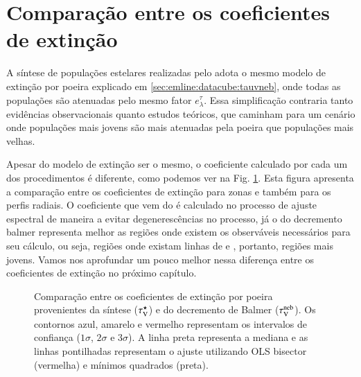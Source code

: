 \section{Comparação entre os coeficientes de extinção}
\label{sec:synvsneb:tauv}

A síntese de populações estelares realizadas pelo \starlight adota o mesmo modelo de extinção por
poeira explicado em \ref{sec:emline:datacube:tauvneb}, onde todas as populações são atenuadas pelo
mesmo fator $e^\tau_\lambda$. Essa simplificação contraria tanto evidências observacionais quanto
estudos teóricos, que caminham para um cenário onde populações mais jovens são mais atenuadas pela
poeira que populações mais velhas. 

Apesar do modelo de extinção ser o mesmo, o coeficiente calculado por cada um dos procedimentos é
diferente, como podemos ver na Fig. \ref{fig:tauVsynvsneb}. Esta figura apresenta a comparação entre
os coeficientes de extinção para zonas e também para os perfis radiais. O coeficiente que vem do
\starlight é calculado no processo de ajuste espectral de maneira a evitar degenerescências no
processo, já o do decremento balmer representa melhor as regiões onde existem os observáveis
necessários para seu cálculo, ou seja, regiões onde existam linhas de \Halpha e \Hbeta, portanto,
regiões mais jovens. Vamos nos aprofundar um pouco melhor nessa diferença entre os coeficientes de
extinção no próximo capítulo.

\begin{figure}
	\centering
	\caption[Comparação entre os coeficientes de extinção.] 
	{Comparação entre os coeficientes de extinção por poeira provenientes da síntese ($\tau_{\mathrm{V}}^\star$) e
	do decremento de Balmer ($\tau_{\mathrm{V}}^{\mathrm{neb}}$). Os contornos azul, amarelo e vermelho representam os intervalos
	de confiança ($1\sigma$, $2\sigma$ e $3\sigma$). A linha preta representa a mediana e as linhas
	pontilhadas representam o ajuste utilizando OLS bisector (vermelha) e mínimos quadrados (preta).}
	\label{fig:tauVsynvsneb}
\end{figure}


